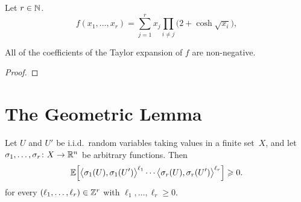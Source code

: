 \begin{definition}
  \label{def:f}
  Let $r \in \mathbb{N}$.
  \begin{equation}\label{eq:f}
    f(x_1,\dots,x_r) = \sum_{j = 1}^r x_j \prod_{i \ne j} \big( 2 + \cosh\sqrt{x_i} \big),
  \end{equation}
\end{definition}

\begin{lemma}
  \label{lem:taylor-nonneg}
  All of the coefficients of the Taylor expansion of $f$ are non-negative.
\end{lemma}
\begin{proof}
\end{proof}


\section{The Geometric Lemma}

\begin{lemma}
  \label{lem:moments}
  Let $U$ and\/ $U'$ be i.i.d.~random variables taking values in a finite set~$X$, and let\/ $\sigma_1,\ldots,\sigma_r \colon X \rightarrow \mathbb{R}^n$ be arbitrary functions. Then
  $$\mathbb{E}\Big[ \big\langle \sigma_1(U),\sigma_1(U') \big\rangle^{\ell_1} \cdots \big\langle \sigma_r(U),\sigma_r(U') \big\rangle^{\ell_r} \Big] \geqslant 0.$$
  for every $(\ell_1,\dots,\ell_r) \in \mathbb{Z}^r$ with $\ell_1,\dots,\ell_r \ge 0$.
\end{lemma}

